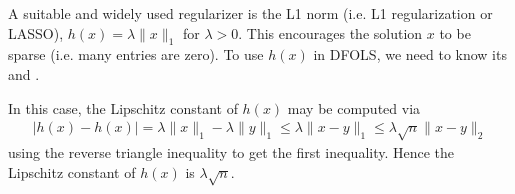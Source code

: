 \documentclass[letterpaper,10pt,english]{sphinxmanual}
\begin{document}
\sphinxAtStartPar
A suitable and widely used regularizer is the L1 norm (i.e. L1 regularization or LASSO), \(h(x)=\lambda\|x\|_1\) for \(\lambda>0\).
This encourages the solution \(x\) to be sparse (i.e. many entries are zero).
To use \(h(x)\) in DFO\sphinxhyphen{}LS, we need to know its  and .

\sphinxAtStartPar
In this case, the Lipschitz constant of \(h(x)\) may be computed via
\begin{equation*}
\begin{split}|h(x) - h(x)| = \lambda\|x\|_1 - \lambda\|y\|_1 \leq \lambda\|x-y\|_1 \leq \lambda\sqrt{n} \|x-y\|_2\end{split}
\end{equation*}
\sphinxAtStartPar
using the reverse triangle inequality to get the first inequality. Hence the Lipschitz constant of \(h(x)\) is \(\lambda\sqrt{n}\).
\end{document}
